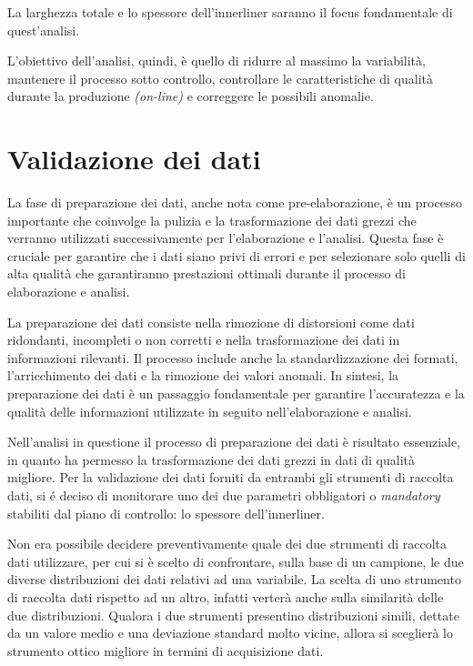 La larghezza totale e lo spessore dell'innerliner saranno il focus fondamentale di quest'analisi.

L'obiettivo dell'analisi, quindi, è quello di ridurre al massimo la variabilità, mantenere il processo sotto controllo, controllare le caratteristiche di qualità durante la produzione \textit{(on-line)} e correggere le possibili anomalie.


\label{Validazione dei dati}
\section{Validazione dei dati}
La fase di preparazione dei dati, anche nota come pre-elaborazione, è un processo importante che coinvolge la pulizia e la trasformazione dei dati grezzi che verranno utilizzati successivamente per l'elaborazione e l'analisi. Questa fase è cruciale per garantire che i dati siano privi di errori e per selezionare solo quelli di alta qualità che garantiranno prestazioni ottimali durante il processo di elaborazione e analisi.

La preparazione dei dati consiste nella rimozione di distorsioni come dati ridondanti, incompleti o non corretti e nella trasformazione dei dati in informazioni rilevanti. Il processo include anche la standardizzazione dei formati, l'arricchimento dei dati e la rimozione dei valori anomali. In sintesi, la preparazione dei dati è un passaggio fondamentale per garantire l'accuratezza e la qualità delle informazioni utilizzate in seguito nell'elaborazione e analisi. 
\cite{Talend}


 Nell'analisi in questione il processo di preparazione dei dati è risultato essenziale, in quanto ha permesso la trasformazione dei dati grezzi in dati di qualità migliore. 
Per la validazione dei dati forniti da entrambi gli strumenti di raccolta dati, si é deciso di monitorare uno dei due parametri obbligatori o \textit{mandatory} stabiliti dal piano di controllo: lo spessore dell'innerliner.

Non era possibile decidere preventivamente quale dei due strumenti di raccolta dati utilizzare, per cui si è scelto di confrontare, sulla base di un campione, le due diverse distribuzioni dei dati relativi ad una variabile.
La scelta di uno strumento di raccolta dati rispetto ad un altro, infatti verterà anche sulla similarità delle due distribuzioni. Qualora i due strumenti presentino distribuzioni simili, dettate da un valore medio e una deviazione standard molto vicine, allora si sceglierà lo strumento ottico migliore in termini di acquisizione dati.

